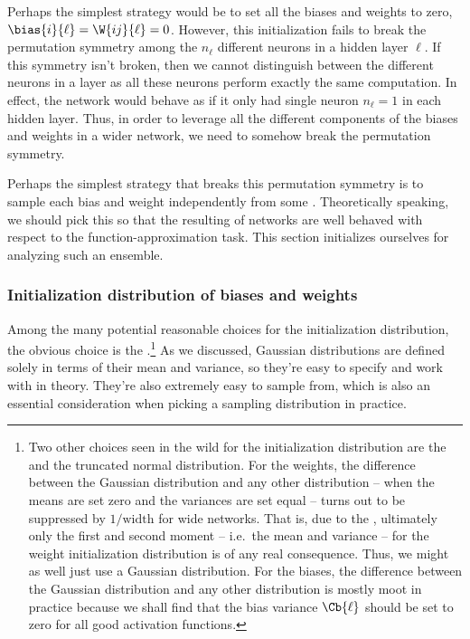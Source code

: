 Perhaps the simplest strategy would be to set all the biases and weights to zero, $\bias{i}{\ell}=\W{ij}{\ell}=0$.
However, this initialization fails to break the permutation symmetry among the $n_\ell$ different neurons in a hidden layer $\ell$. If this symmetry isn't broken,
then
we
cannot distinguish between the different neurons in a layer as all these neurons perform exactly the same computation. In effect,
the network would behave as if it only had single neuron $n_{\ell}=1$ in each hidden layer.
Thus, in order to leverage all the different components of the biases and weights in a wider network, we need to somehow break the permutation symmetry.

Perhaps the simplest strategy that breaks this permutation symmetry is to 
sample each bias and weight independently from some .
Theoretically speaking, we should pick this  so that the resulting  of networks are well behaved with respect to the function-approximation task.
This section initializes ourselves for analyzing such an ensemble.














\subsubsection{Initialization distribution of biases and weights}


Among the many potential reasonable choices for the initialization distribution, the obvious choice is the .\footnote{ 
Two other choices seen in the wild for the initialization distribution are the  and the truncated normal distribution.
For the weights, the difference between the Gaussian distribution and any other distribution -- when the means are set zero and the variances are set equal -- turns out to be suppressed by $1/\text{width}$ for wide networks. 
That is, due to the , ultimately only the first and second moment -- i.e.~the mean and variance -- for the weight initialization distribution is of any real consequence. Thus, we might as well just use a Gaussian distribution.
For the biases, the difference between the Gaussian distribution and any other distribution is mostly moot in practice because we shall find that the bias variance $\Cb{\ell}$ should be set to zero for all good activation functions.
}
As we discussed, Gaussian distributions are defined solely in terms of their mean and variance, so they're easy to specify and work with in theory. They're also extremely easy to sample from, which is also an essential consideration when picking a sampling distribution in practice.

